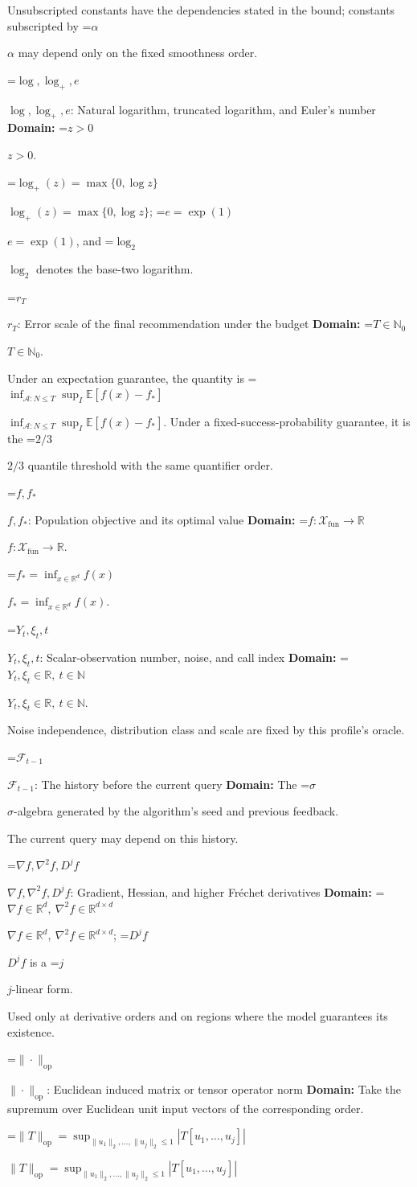 \documentclass[10pt,a4paper]{article}
\newcommand{\AtlasMath}[1]{\par\begingroup\centering\setbox0=\hbox{$\displaystyle #1$}\ifdim\wd0>1.4\linewidth\typeout{ATLAS WIDE FORMULA: \the\wd0}\fi\ifdim\wd0>\linewidth\resizebox{\linewidth}{!}{\box0}\else\box0\fi\par\endgroup}
\newcommand{\AtlasInlineMath}[1]{\begingroup\setbox0=\hbox{$#1$}\ifdim\wd0>.4\linewidth\endgroup\AtlasMath{#1}\else\endgroup$#1$\fi}
\begin{document}
Unsubscripted constants have the dependencies stated in the bound; constants subscripted by \AtlasInlineMath{\alpha} may depend only on the fixed smoothness order.

\AtlasInlineMath{\log,\log_+,e}: Natural logarithm, truncated logarithm, and Euler's number \textbf{Domain:} \AtlasInlineMath{z>0}.

\AtlasInlineMath{\log_+(z)=\max\{0,\log z\}}; \AtlasInlineMath{e=\exp(1)}, and \AtlasInlineMath{\log_2} denotes the base-two logarithm.

\AtlasInlineMath{r_T}: Error scale of the final recommendation under the budget \textbf{Domain:} \AtlasInlineMath{T\in\mathbb{N}_0}.

Under an expectation guarantee, the quantity is \AtlasInlineMath{\inf_{\mathcal{A}:N\le T}\sup_I\mathbb{E}[f(\widehat{x})-f_*]}. Under a fixed-success-probability guarantee, it is the \AtlasInlineMath{2/3} quantile threshold with the same quantifier order.

\AtlasInlineMath{f,f_*}: Population objective and its optimal value \textbf{Domain:} \AtlasInlineMath{f:\mathcal{X}_{\mathrm{fun}}\to\mathbb{R}}.

\AtlasInlineMath{f_*=\inf_{x\in \mathbb{R}^d}f(x)}.

\AtlasInlineMath{Y_t,\xi_t,t}: Scalar-observation number, noise, and call index \textbf{Domain:} \AtlasInlineMath{Y_t,\xi_t\in\mathbb{R},\ t\in\mathbb{N}}.

Noise independence, distribution class and scale are fixed by this profile's oracle.

\AtlasInlineMath{\mathcal{F}_{t-1}}: The history before the current query \textbf{Domain:} The \AtlasInlineMath{\sigma}-algebra generated by the algorithm's seed and previous feedback.

The current query may depend on this history.

\AtlasInlineMath{\nabla f,\nabla^2f,D^jf}: Gradient, Hessian, and higher Fréchet derivatives \textbf{Domain:} \AtlasInlineMath{\nabla f\in\mathbb{R}^d,\ \nabla^2f\in\mathbb{R}^{d\times d}}; \AtlasInlineMath{D^jf} is a \AtlasInlineMath{j}-linear form.

Used only at derivative orders and on regions where the model guarantees its existence.

\AtlasInlineMath{\|\cdot\|_{\mathrm{op}}}: Euclidean induced matrix or tensor operator norm \textbf{Domain:} Take the supremum over Euclidean unit input vectors of the corresponding order.

\AtlasInlineMath{\|T\|_{\mathrm{op}}=\sup_{\|u_1\|_2,\ldots,\|u_j\|_2\le1}|T[u_1,\ldots,u_j]|}
\end{document}
